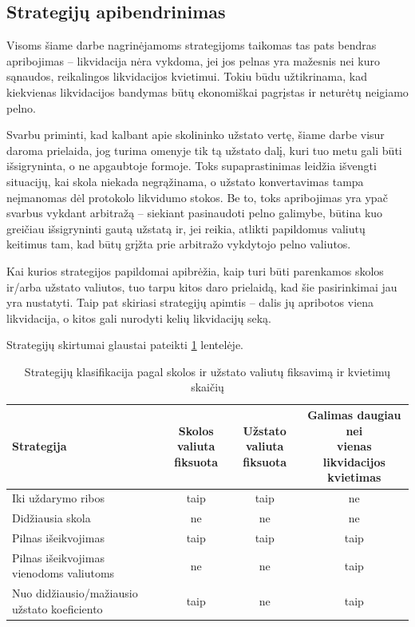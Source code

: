 \documentclass[]{VUMIFTemplateClass}
\begin{document}
\subsection{Strategijų apibendrinimas}
\label{sec:strategiju_apibendrinimas}

Visoms šiame darbe nagrinėjamoms strategijoms taikomas tas pats bendras apribojimas – likvidacija nėra vykdoma, jei jos pelnas yra mažesnis nei kuro sąnaudos, reikalingos likvidacijos kvietimui. Tokiu būdu užtikrinama, kad kiekvienas likvidacijos bandymas būtų ekonomiškai pagrįstas ir neturėtų neigiamo pelno.

Svarbu priminti, kad kalbant apie skolininko užstato vertę, šiame darbe visur daroma prielaida, jog turima omenyje tik tą užstato dalį, kuri tuo metu gali būti išsigryninta, o ne apgaubtoje formoje. Toks supaprastinimas leidžia išvengti situacijų, kai skola niekada negrąžinama, o užstato konvertavimas tampa neįmanomas dėl protokolo likvidumo stokos. Be to, toks apribojimas yra ypač svarbus vykdant arbitražą – siekiant pasinaudoti pelno galimybe, būtina kuo greičiau išsigryninti gautą užstatą ir, jei reikia, atlikti papildomus valiutų keitimus tam, kad būtų grįžta prie arbitražo vykdytojo pelno valiutos.

Kai kurios strategijos papildomai apibrėžia, kaip turi būti parenkamos skolos ir/arba užstato valiutos, tuo tarpu kitos daro prielaidą, kad šie pasirinkimai jau yra nustatyti. Taip pat skiriasi strategijų apimtis – dalis jų apribotos viena likvidacija, o kitos gali nurodyti kelių likvidacijų seką.

Strategijų skirtumai glaustai pateikti \ref{tab:strategiju_klasifikacija} lentelėje.

\begin{table}[H]
    \centering
    \caption{Strategijų klasifikacija pagal skolos ir užstato valiutų fiksavimą ir kvietimų skaičių}
    \begin{tabular}{|>{\raggedright\arraybackslash}p{5.5cm}|c|c|c|}
      \hline
      \textbf{Strategija} & \makecell{\textbf{Skolos valiuta} \\ \textbf{fiksuota}} & \makecell{\textbf{Užstato valiuta} \\ \textbf{fiksuota}} & \makecell{\textbf{Galimas daugiau nei} \\ \textbf{vienas likvidacijos kvietimas}} \\
      \hline
      Iki uždarymo ribos & taip & taip & ne \\
      \hline
      Didžiausia skola   & ne & ne & ne \\
      \hline
      Pilnas išeikvojimas  & taip & taip & taip \\
      \hline
      Pilnas išeikvojimas vienodoms valiutoms  & ne & ne & taip \\
      \hline
      Nuo didžiausio/mažiausio užstato koeficiento & taip & ne & taip \\
      \hline
    \end{tabular}
    \label{tab:strategiju_klasifikacija}
\end{table}
  
\end{document}
